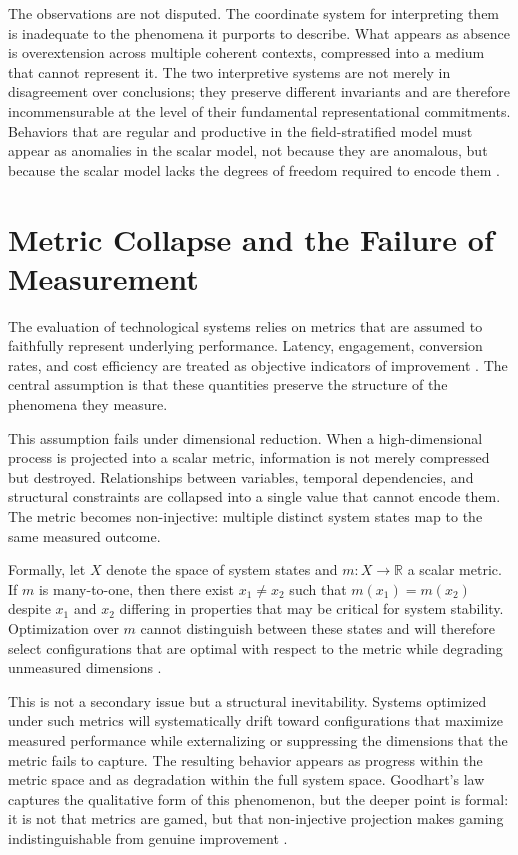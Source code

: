 \documentclass[12pt, a4paper]{article}
\begin{document}
The observations are not disputed. The coordinate system for interpreting them is inadequate to the phenomena it purports to describe. What appears as absence is overextension across multiple coherent contexts, compressed into a medium that cannot represent it. The two interpretive systems are not merely in disagreement over conclusions; they preserve different invariants and are therefore incommensurable at the level of their fundamental representational commitments. Behaviors that are regular and productive in the field-stratified model must appear as anomalies in the scalar model, not because they are anomalous, but because the scalar model lacks the degrees of freedom required to encode them \cite{Barandes2023}.

\section{Metric Collapse and the Failure of Measurement}

The evaluation of technological systems relies on metrics that are assumed to faithfully represent underlying performance. Latency, engagement, conversion rates, and cost efficiency are treated as objective indicators of improvement \cite{Goodhart1975}. The central assumption is that these quantities preserve the structure of the phenomena they measure.

This assumption fails under dimensional reduction. When a high-dimensional process is projected into a scalar metric, information is not merely compressed but destroyed. Relationships between variables, temporal dependencies, and structural constraints are collapsed into a single value that cannot encode them. The metric becomes non-injective: multiple distinct system states map to the same measured outcome.

Formally, let $X$ denote the space of system states and $m \colon X \to \mathbb{R}$ a scalar metric. If $m$ is many-to-one, then there exist $x_1 \neq x_2$ such that $m(x_1) = m(x_2)$ despite $x_1$ and $x_2$ differing in properties that may be critical for system stability. Optimization over $m$ cannot distinguish between these states and will therefore select configurations that are optimal with respect to the metric while degrading unmeasured dimensions \cite{Ashby1956}.

This is not a secondary issue but a structural inevitability. Systems optimized under such metrics will systematically drift toward configurations that maximize measured performance while externalizing or suppressing the dimensions that the metric fails to capture. The resulting behavior appears as progress within the metric space and as degradation within the full system space. Goodhart's law captures the qualitative form of this phenomenon, but the deeper point is formal: it is not that metrics are gamed, but that non-injective projection makes gaming indistinguishable from genuine improvement \cite{Goodhart1975}.
\end{document}
